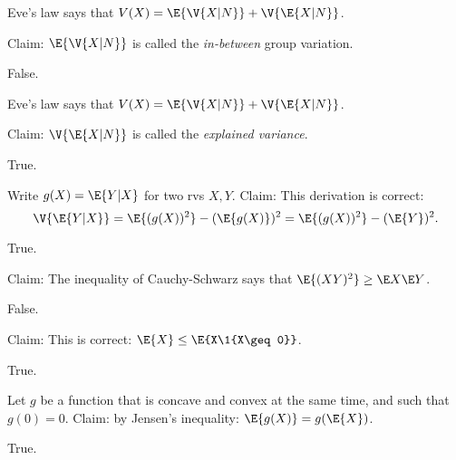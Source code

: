 \documentclass[tf-tutorial-all.tex]{subfiles}
\begin{document}
\begin{truefalse}
Eve's law says that $V(X) = \E{\V{X|N}} + \V{\E{X|N}}$.

Claim: $\E{\V{X|N}}$ is called the \emph{in-between} group variation.

\begin{solution}
False.
\end{solution}
\end{truefalse}


\begin{truefalse}
Eve's law says that $V(X) = \E{\V{X|N}} + \V{\E{X|N}}$.

Claim: $\V{\E{X|N}}$ is called the \emph{explained variance}.

\begin{solution}
True.
\end{solution}
\end{truefalse}



\begin{truefalse}
Write $g(X) = \E{Y|X}$ for two rvs $X, Y$.
Claim: This derivation is correct:
\begin{equation}
\label{eq:7}
\V{\E{Y|X}} = \E{(g(X))^2} - (\E{g(X)})^{2} = \E{(g(X))^2} - (\E{Y})^{2}.
\end{equation}

\begin{solution}
True.
\end{solution}
\end{truefalse}

\begin{truefalse}
Claim: The inequality of Cauchy-Schwarz says that $\E{(XY)^{2}} \geq \E X \E Y$.

\begin{solution}
False.
\end{solution}
\end{truefalse}


\begin{truefalse}
Claim: This is correct: $\E{X} \leq \E{X\1{X\geq 0}}$.
\begin{solution}
True.
\end{solution}
\end{truefalse}



\begin{truefalse}
Let $g$ be a function that is concave and convex at the same time, and such that $g(0) = 0$.
Claim: by Jensen's inequality: $\E{g(X)} = g(\E{X})$.

\begin{solution}
True.
\end{solution}
\end{truefalse}
\end{document}
